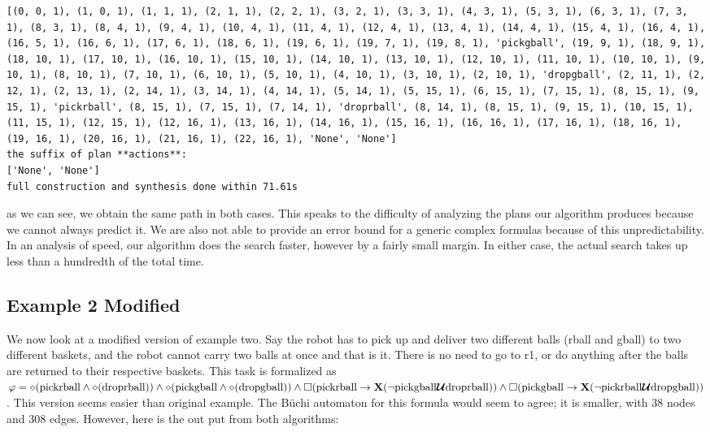 \begin{lstlisting}
[(0, 0, 1), (1, 0, 1), (1, 1, 1), (2, 1, 1), (2, 2, 1), (3, 2, 1), (3, 3, 1), (4, 3, 1), (5, 3, 1), (6, 3, 1), (7, 3, 1), (8, 3, 1), (8, 4, 1), (9, 4, 1), (10, 4, 1), (11, 4, 1), (12, 4, 1), (13, 4, 1), (14, 4, 1), (15, 4, 1), (16, 4, 1), (16, 5, 1), (16, 6, 1), (17, 6, 1), (18, 6, 1), (19, 6, 1), (19, 7, 1), (19, 8, 1), 'pickgball', (19, 9, 1), (18, 9, 1), (18, 10, 1), (17, 10, 1), (16, 10, 1), (15, 10, 1), (14, 10, 1), (13, 10, 1), (12, 10, 1), (11, 10, 1), (10, 10, 1), (9, 10, 1), (8, 10, 1), (7, 10, 1), (6, 10, 1), (5, 10, 1), (4, 10, 1), (3, 10, 1), (2, 10, 1), 'dropgball', (2, 11, 1), (2, 12, 1), (2, 13, 1), (2, 14, 1), (3, 14, 1), (4, 14, 1), (5, 14, 1), (5, 15, 1), (6, 15, 1), (7, 15, 1), (8, 15, 1), (9, 15, 1), 'pickrball', (8, 15, 1), (7, 15, 1), (7, 14, 1), 'droprball', (8, 14, 1), (8, 15, 1), (9, 15, 1), (10, 15, 1), (11, 15, 1), (12, 15, 1), (12, 16, 1), (13, 16, 1), (14, 16, 1), (15, 16, 1), (16, 16, 1), (17, 16, 1), (18, 16, 1), (19, 16, 1), (20, 16, 1), (21, 16, 1), (22, 16, 1), 'None', 'None']
the suffix of plan **actions**:
['None', 'None']
full construction and synthesis done within 71.61s 
\end{lstlisting}
as we can see, we obtain the same path in both cases. This speaks to the difficulty of analyzing the plans our algorithm produces because we cannot always predict it. We are also not able to provide an error bound for a generic complex formulas because of this unpredictability. In an analysis of speed, our algorithm does the search faster, however by a fairly small margin. In either case, the actual search takes up less than a hundredth of the total time.

\subsection{Example 2 Modified}
We now look at a modified version of example two. Say the robot has to pick up and deliver two different balls (rball and gball) to two different baskets, and the robot cannot carry two balls at once and that is it. There is no need to go to r1, or do anything after the balls are returned to their respective baskets. This task is formalized as $\varphi = \diamond (\text{pickrball} \wedge \diamond (\text{droprball})) \wedge \diamond(\text{pickgball} \wedge \diamond (\text{dropgball})) \wedge \square (\text{pickrball} \rightarrow \textbf{X}(\neg \text{pickgball} \bm{\mathcal{U}} \text{droprball})) \wedge \square (\text{pickgball} \rightarrow \textbf{X} (\neg \text{pickrball} \bm{\mathcal{U}} \text{dropgball}))$. This version seems easier than original example. The B\"uchi automaton for this formula would seem to agree; it is smaller, with 38 nodes and 308 edges. However, here is the out put from both algorithms:

